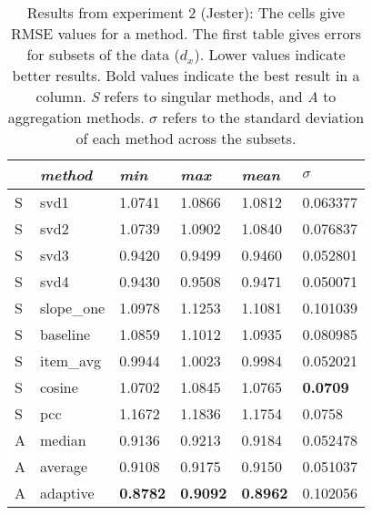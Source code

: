 \begin{table}[p]
  \begin{tabular*}{\textwidth}{ l p{3cm} p{2cm} p{2cm} p{2cm} p{2cm} }
    \toprule
      ~ & \emph{method} & 
      \emph{min} & \emph{max} & \emph{mean} & $\sigma$\\
    \midrule
    S & svd1       &  1.0741  &  1.0866  &  1.0812  &  0.063377  \\
    S & svd2       &  1.0739  &  1.0902  &  1.0840  &  0.076837  \\
    S & svd3       &  0.9420  &  0.9499  &  0.9460  &  0.052801  \\
    S & svd4       &  0.9430  &  0.9508  &  0.9471  &  0.050071  \\
    S & slope\_one &  1.0978  &  1.1253  &  1.1081  &  0.101039  \\
    S & baseline   &  1.0859  &  1.1012  &  1.0935  &  0.080985  \\
    S & item\_avg  &  0.9944  &  1.0023  &  0.9984  &  0.052021  \\
    S & cosine     &  1.0702  &  1.0845  &  1.0765  &  \textbf{0.0709}    \\
    S & pcc        &  1.1672  &  1.1836  &  1.1754  &  0.0758    \\
    \midrule
    A & median   &  0.9136  &  0.9213  &  0.9184  &  0.052478  \\
    A & average  &  0.9108  &  0.9175  &  0.9150  &  0.051037  \\
    A & adaptive  &  \textbf{0.8782}  &  \textbf{0.9092}  &  \textbf{0.8962}  &  0.102056  \\
    \bottomrule
  \end{tabular*}
  \vspace{2em}

  \caption[Results from Experiment 2]{
    Results from experiment 2 (Jester):
    The cells give RMSE values for a method.
    The first table gives errors for subsets of the data ($d_x$).
    Lower values indicate better results.
    Bold values indicate the best result in a column.
    \emph{S} refers to singular methods, and \emph{A} to aggregation methods.
    $\sigma$ refers to the standard deviation of each method across the subsets.
  }
  \label{table:results:e2}
\end{table}

